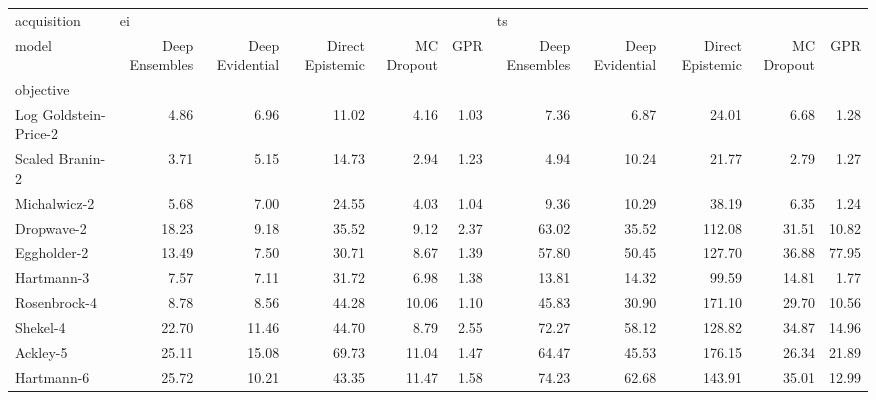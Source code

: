 \begin{tabular}{lrrrrrrrrrr}
\toprule
acquisition & \multicolumn{5}{l}{ei} & \multicolumn{5}{l}{ts} \\
model & Deep Ensembles & Deep Evidential & Direct Epistemic & MC Dropout &   GPR & Deep Ensembles & Deep Evidential & Direct Epistemic & MC Dropout &    GPR \\
objective             &                &                 &                  &            &       &                &                 &                  &            &        \\
\midrule
Log Goldstein-Price-2 &           4.86 &            6.96 &            11.02 &       4.16 &  1.03 &           7.36 &            6.87 &            24.01 &       6.68 &   1.28 \\
Scaled Branin-2       &           3.71 &            5.15 &            14.73 &       2.94 &  1.23 &           4.94 &           10.24 &            21.77 &       2.79 &   1.27 \\
Michalwicz-2          &           5.68 &            7.00 &            24.55 &       4.03 &  1.04 &           9.36 &           10.29 &            38.19 &       6.35 &   1.24 \\
Dropwave-2            &          18.23 &            9.18 &            35.52 &       9.12 &  2.37 &          63.02 &           35.52 &           112.08 &      31.51 &  10.82 \\
Eggholder-2           &          13.49 &            7.50 &            30.71 &       8.67 &  1.39 &          57.80 &           50.45 &           127.70 &      36.88 &  77.95 \\
Hartmann-3            &           7.57 &            7.11 &            31.72 &       6.98 &  1.38 &          13.81 &           14.32 &            99.59 &      14.81 &   1.77 \\
Rosenbrock-4          &           8.78 &            8.56 &            44.28 &      10.06 &  1.10 &          45.83 &           30.90 &           171.10 &      29.70 &  10.56 \\
Shekel-4              &          22.70 &           11.46 &            44.70 &       8.79 &  2.55 &          72.27 &           58.12 &           128.82 &      34.87 &  14.96 \\
Ackley-5              &          25.11 &           15.08 &            69.73 &      11.04 &  1.47 &          64.47 &           45.53 &           176.15 &      26.34 &  21.89 \\
Hartmann-6            &          25.72 &           10.21 &            43.35 &      11.47 &  1.58 &          74.23 &           62.68 &           143.91 &      35.01 &  12.99 \\
\bottomrule
\end{tabular}
